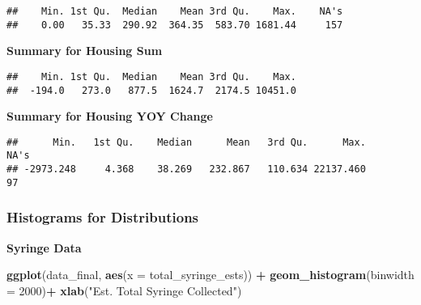 \documentclass[
]{article}
\newenvironment{Shaded}{\begin{snugshade}}{\end{snugshade}}
\newcommand{\AttributeTok}[1]{\textcolor[rgb]{0.13,0.29,0.53}{#1}}
\newcommand{\DecValTok}[1]{\textcolor[rgb]{0.00,0.00,0.81}{#1}}
\newcommand{\FunctionTok}[1]{\textcolor[rgb]{0.13,0.29,0.53}{\textbf{#1}}}
\newcommand{\NormalTok}[1]{#1}
\newcommand{\SpecialCharTok}[1]{\textcolor[rgb]{0.81,0.36,0.00}{\textbf{#1}}}
\newcommand{\StringTok}[1]{\textcolor[rgb]{0.31,0.60,0.02}{#1}}
\begin{document}
\begin{verbatim}
##    Min. 1st Qu.  Median    Mean 3rd Qu.    Max.    NA's 
##    0.00   35.33  290.92  364.35  583.70 1681.44     157
\end{verbatim}

\textbf{Summary for Housing Sum}

\begin{Shaded}
\end{Shaded}

\begin{verbatim}
##    Min. 1st Qu.  Median    Mean 3rd Qu.    Max. 
##  -194.0   273.0   877.5  1624.7  2174.5 10451.0
\end{verbatim}

\textbf{Summary for Housing YOY Change}

\begin{Shaded}
\end{Shaded}

\begin{verbatim}
##      Min.   1st Qu.    Median      Mean   3rd Qu.      Max.      NA's 
## -2973.248     4.368    38.269   232.867   110.634 22137.460        97
\end{verbatim}

\subsubsection{Histograms for
Distributions}\label{histograms-for-distributions}

\textbf{Syringe Data}

\begin{Shaded}
\begin{Highlighting}[]
\FunctionTok{ggplot}\NormalTok{(data\_final, }\FunctionTok{aes}\NormalTok{(}\AttributeTok{x =}\NormalTok{ total\_syringe\_ests)) }\SpecialCharTok{+} \FunctionTok{geom\_histogram}\NormalTok{(}\AttributeTok{binwidth =} \DecValTok{2000}\NormalTok{)}\SpecialCharTok{+} \FunctionTok{xlab}\NormalTok{(}\StringTok{"Est. Total Syringe Collected"}\NormalTok{)}
\end{Highlighting}
\end{Shaded}
\end{document}
